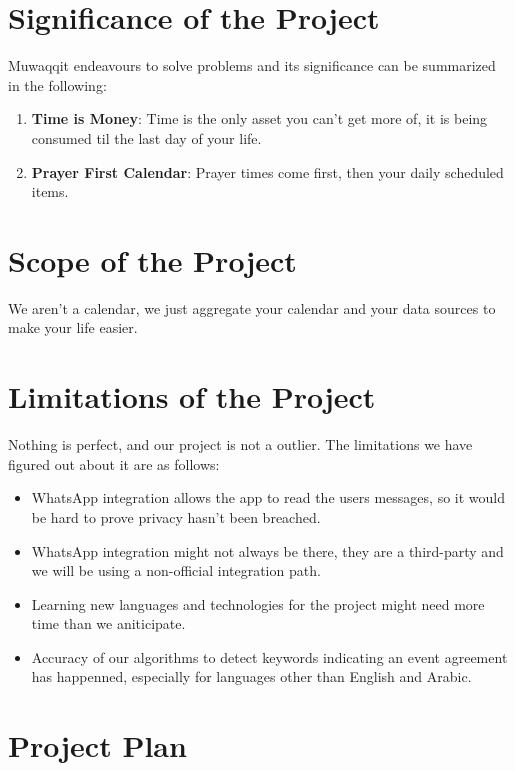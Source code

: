 \documentclass[12pt,a4paper]{article}
\begin{document}
\section{Significance of the Project}

Muwaqqit endeavours to solve problems and its significance can be summarized in the following:

\begin{enumerate}
    \item \textbf{Time is Money}: Time is the only asset you can't get more of, it is being consumed til the last day of your life.
    \item \textbf{Prayer First Calendar}: Prayer times come first, then your daily scheduled items.
\end{enumerate}

\section{Scope of the Project}

We aren't a calendar, we just aggregate your calendar and your data sources to make your life easier.

\section{Limitations of the Project}

Nothing is perfect, and our project is not a outlier. The limitations we have figured out about it are as follows:

\begin{itemize}
    \item WhatsApp integration allows the app to read the users messages, so it would be hard to prove privacy hasn't been breached.
    \item WhatsApp integration might not always be there, they are a third-party and we will be using a non-official integration path.
    \item Learning new languages and technologies for the project might need more time than we aniticipate.
    \item Accuracy of our algorithms to detect keywords indicating an event agreement has happenned, especially for languages other than English and Arabic.
\end{itemize}

\section{Project Plan}
\end{document}

